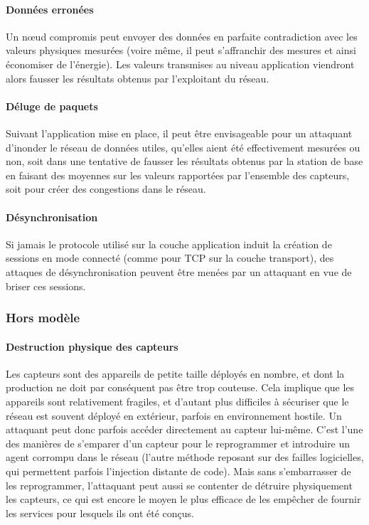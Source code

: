         \paragraph{Données erronées}
Un nœud compromis peut envoyer des données en parfaite contradiction avec les valeurs physiques mesurées (voire même, il peut s'affranchir des mesures et ainsi économiser de l'énergie).
Les valeurs transmises au niveau application viendront alors fausser les résultats obtenus par l'exploitant du réseau.

        \paragraph{Déluge de paquets}
Suivant l'application mise en place, il peut être envisageable pour un attaquant d'inonder le réseau de données utiles, qu'elles aient été effectivement mesurées ou non, soit dans une tentative de fausser les résultats obtenus par la station de base en faisant des moyennes sur les valeurs rapportées par l'ensemble des capteurs, soit pour créer des congestions dans le réseau.

        \paragraph{Désynchronisation}
Si jamais le protocole utilisé sur la couche application induit la création de sessions en mode connecté (comme pour TCP sur la couche transport), des attaques de désynchronisation peuvent être menées par un attaquant en vue de briser ces sessions.

    \subsubsection{Hors modèle}
        \paragraph{Destruction physique des capteurs}
Les capteurs sont des appareils de petite taille déployés en nombre, et dont la production ne doit par conséquent pas être trop couteuse.
Cela implique que les appareils sont relativement fragiles, et d'autant plus difficiles à sécuriser que le réseau est souvent déployé en extérieur, parfois en environnement hostile.
Un attaquant peut donc parfois accéder directement au capteur lui-même.
C'est l'une des manières de s'emparer d'un capteur pour le reprogrammer et introduire un agent corrompu dans le réseau (l'autre méthode reposant sur des failles logicielles, qui permettent parfois l'injection distante de code).
Mais sans s'embarrasser de les reprogrammer, l'attaquant peut aussi se contenter de détruire physiquement les capteurs, ce qui est encore le moyen le plus efficace de les empêcher de fournir les services pour lesquels ils ont été conçus.

